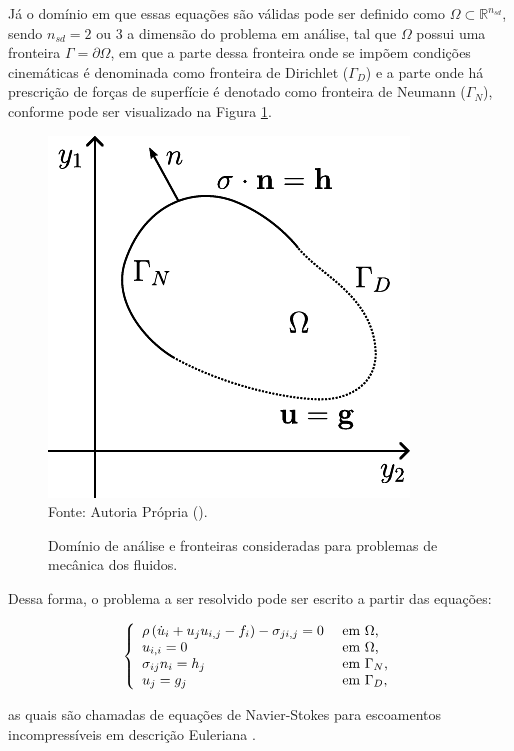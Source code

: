 Já o domínio em que essas equações são válidas pode ser definido como $\Omega\subset\mathbb{R}^{n_{sd}}$, sendo $n_{sd}=2$ ou $3$ a dimensão do problema em análise, tal que $\Omega$ possui uma fronteira $\Gamma=\partial\Omega$, em que a parte dessa fronteira onde se impõem condições cinemáticas é denominada como fronteira de Dirichlet ($\Gamma_D$) e a parte onde há prescrição de forças de superfície é denotado como fronteira de Neumann ($\Gamma_N$), conforme pode ser visualizado na Figura \ref{fig:Dom}.

\begin{figure}[h!]
    \centering
    \caption{Domínio de análise e fronteiras consideradas para problemas de mecânica dos fluidos.}
    \includegraphics[width=.35\linewidth]{Figuras/Dom}
    \\Fonte: Autoria Própria (\the\year).
    \label{fig:Dom}
\end{figure}

Dessa forma, o problema a ser resolvido pode ser escrito a partir das equações:

\begin{equation}
    \left\{
    \begin{array}{ll}
        \rho\left({\dot{u}_i+u_ju_{i,j}-f_i}\right)-\sigma_{ji,j}=0 & \text{ em }\Omega\text{,}   \\
        u_{i,i}=0                                             & \text{ em }\Omega\text{,}   \\
        \sigma_{ij}n_i=h_j                                    & \text{ em }\Gamma_N\text{,} \\
        u_j=g_j                                               & \text{ em }\Gamma_D\text{,}
    \end{array}
    \right.\label{eq:NS-Euler}
\end{equation}

\noindent as quais são chamadas de equações de Navier-Stokes para escoamentos incompressíveis em descrição Euleriana \cite{bazilevs2013computational,bazilevs2010large,bazilevs2007variational,hughes2002variational,hughes2000large}.

